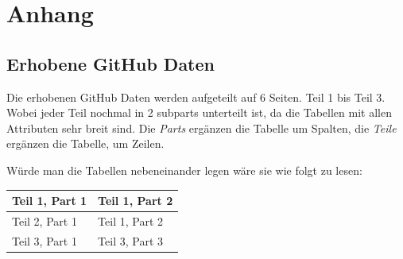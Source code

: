 \chapter[Anhang]{Anhang}

\section{Erhobene GitHub Daten}

Die erhobenen GitHub Daten werden aufgeteilt auf 6 Seiten. Teil 1 bis Teil 3. Wobei jeder Teil nochmal in 2 subparts unterteilt ist,
da die Tabellen mit allen Attributen sehr breit sind. Die \textit{Parts} ergänzen die Tabelle um Spalten, die \textit{Teile} ergänzen die Tabelle, um Zeilen.

Würde man die Tabellen nebeneinander legen wäre sie wie folgt zu lesen:

\begin{table}[h]
    \begin{tabular}{|l|l|}
        \hline
        Teil 1, Part 1 & Teil 1, Part 2 \\ \hline
        Teil 2, Part 1 & Teil 1, Part 2 \\ \hline
        Teil 3, Part 1 & Teil 3, Part 3 \\ \hline
    \end{tabular}%
\end{table}

